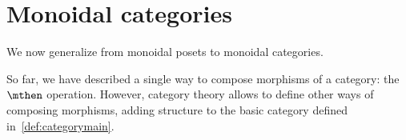 \devel{}



\section{Monoidal categories}
\label{sec:parallelism-mon-cat}

We now generalize from monoidal posets to monoidal categories.

So far, we have described a single way to compose morphisms of a category: the~$\mthen$ operation.
However, category theory allows to define other ways of composing morphisms, adding structure to the basic category defined in~\cref{def:categorymain}.

